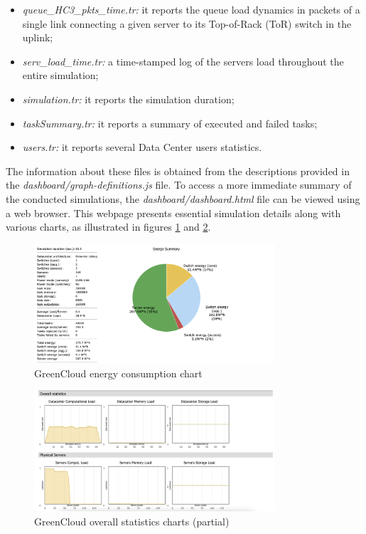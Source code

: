 \begin{itemize}
    \item \emph{queue\_HC3\_pkts\_time.tr:} it reports the queue load dynamics in packets of a single link connecting a given server to its Top-of-Rack (ToR) switch in the uplink;
    \item \emph{serv\_load\_time.tr:} a time-stamped log of the servers load throughout the entire simulation;
    \item \emph{simulation.tr:} it reports the simulation duration;
    \item \emph{taskSummary.tr:} it reports a summary of executed and failed tasks;
    \item \emph{users.tr:} it reports several Data Center users statistics.
\end{itemize}
The information about these files is obtained from the descriptions provided in the \emph{dashboard/graph-definitions.js} file. To access a more immediate summary of the conducted simulations, the \emph{dashboard/dashboard.html} file can be viewed using a web browser. This webpage presents essential simulation details along with various charts, as illustrated in figures \ref{fig:greencloud_energy} and \ref{fig:greencloud_overall}. 
\begin{figure}[h]
    \centering
    \includegraphics[width=0.8\textwidth]{chapters/images/greencloud_energy.png}
    \caption{GreenCloud energy consumption chart}
    \label{fig:greencloud_energy}
\end{figure}

\begin{figure}[h]
    \centering
    \includegraphics[width=0.8\textwidth]{chapters/images/greencloud_overall.png}
    \caption{GreenCloud overall statistics charts (partial)}
    \label{fig:greencloud_overall}
\end{figure}
